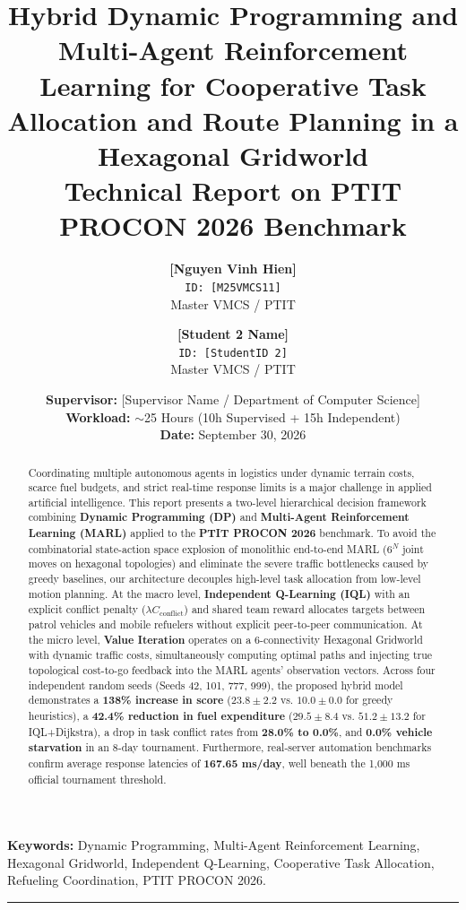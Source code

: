 \documentclass[11pt,a4paper]{article}
\title{\vspace{-1.0cm}\Large\textbf{Hybrid Dynamic Programming and Multi-Agent Reinforcement Learning for Cooperative Task Allocation and Route Planning in a Hexagonal Gridworld}\\[0.3cm]
\large Technical Report on PTIT PROCON 2026 Benchmark}
\author{
    \textbf{[Nguyen Vinh Hien]} \\
    \texttt{ID: [M25VMCS11]} \\
    \small Master VMCS / PTIT
    \and
    \textbf{[Student 2 Name]} \\
    \texttt{ID: [StudentID 2]} \\
    \small Master VMCS / PTIT
}
\date{
    \small
    \textbf{Supervisor:} [Supervisor Name / Department of Computer Science] \\
    \textbf{Workload:} $\sim$25 Hours (10h Supervised + 15h Independent) \\
    \textbf{Date:} September 30, 2026
}
\begin{document}
\maketitle

\begin{abstract}
Coordinating multiple autonomous agents in logistics under dynamic terrain costs, scarce fuel budgets, and strict real-time response limits is a major challenge in applied artificial intelligence. This report presents a two-level hierarchical decision framework combining \textbf{Dynamic Programming (DP)} and \textbf{Multi-Agent Reinforcement Learning (MARL)} applied to the \textbf{PTIT PROCON 2026} benchmark. To avoid the combinatorial state-action space explosion of monolithic end-to-end MARL ($6^N$ joint moves on hexagonal topologies) and eliminate the severe traffic bottlenecks caused by greedy baselines, our architecture decouples high-level task allocation from low-level motion planning. At the macro level, \textbf{Independent Q-Learning (IQL)} with an explicit conflict penalty ($\lambda C_{\text{conflict}}$) and shared team reward allocates targets between patrol vehicles and mobile refuelers without explicit peer-to-peer communication. At the micro level, \textbf{Value Iteration} operates on a 6-connectivity Hexagonal Gridworld with dynamic traffic costs, simultaneously computing optimal paths and injecting true topological cost-to-go feedback into the MARL agents' observation vectors. Across four independent random seeds (Seeds 42, 101, 777, 999), the proposed hybrid model demonstrates a \textbf{138\% increase in score} ($23.8 \pm 2.2$ vs. $10.0 \pm 0.0$ for greedy heuristics), a \textbf{42.4\% reduction in fuel expenditure} ($29.5 \pm 8.4$ vs. $51.2 \pm 13.2$ for IQL+Dijkstra), a drop in task conflict rates from \textbf{28.0\% to 0.0\%}, and \textbf{0.0\% vehicle starvation} in an 8-day tournament. Furthermore, real-server automation benchmarks confirm average response latencies of \textbf{167.65 ms/day}, well beneath the 1,000 ms official tournament threshold.
\end{abstract}

\textbf{Keywords:} Dynamic Programming, Multi-Agent Reinforcement Learning, Hexagonal Gridworld, Independent Q-Learning, Cooperative Task Allocation, Refueling Coordination, PTIT PROCON 2026.

\vspace{0.4cm}
\hrule
\vspace{0.4cm}

\end{document}

